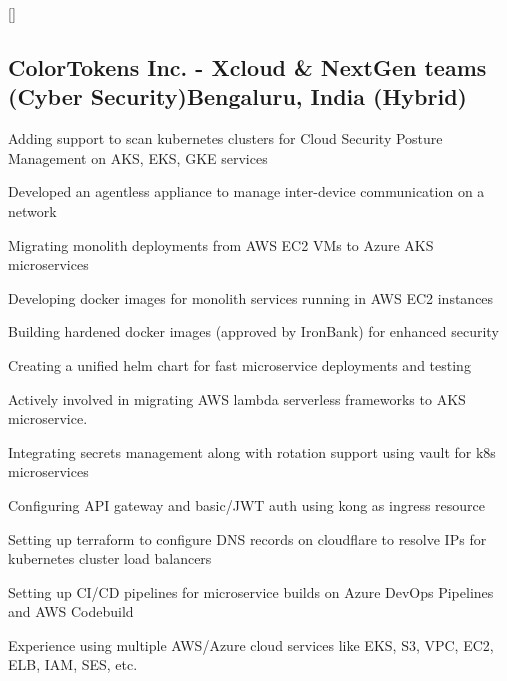 \documentclass[letter,10pt]{article}
\begin{document}
\titlespacing*{\subsubsection}{0em}{0em}{0em}
\titleformat{\subsubsection}{\itshape}{}{0em}{}[]


\subsection{ColorTokens Inc. - Xcloud \& NextGen teams (Cyber Security)\hfill Bengaluru, India (Hybrid)}
\begin{zitemize}
\item Adding support to scan kubernetes clusters for Cloud Security Posture Management on AKS, EKS, GKE services
\item Developed an agentless appliance to manage inter-device communication on a network
\item Migrating monolith deployments from AWS EC2 VMs to Azure AKS microservices
\item Developing docker images for monolith services running in AWS EC2 instances
\item Building hardened docker images (approved by IronBank) for enhanced security
\item Creating a unified helm chart for fast microservice deployments and testing
\item Actively involved in migrating AWS lambda serverless frameworks to AKS microservice.
\item Integrating secrets management along with rotation support using vault for k8s microservices
\item Configuring API gateway and basic/JWT auth using kong as ingress resource
\item Setting up terraform to configure DNS records on cloudflare to resolve IPs for kubernetes cluster load balancers
\item Setting up CI/CD pipelines for microservice builds on Azure DevOps Pipelines and AWS Codebuild
\item Experience using multiple AWS/Azure cloud services like EKS, S3, VPC, EC2, ELB, IAM, SES, etc.
\end{zitemize}
\end{document}
